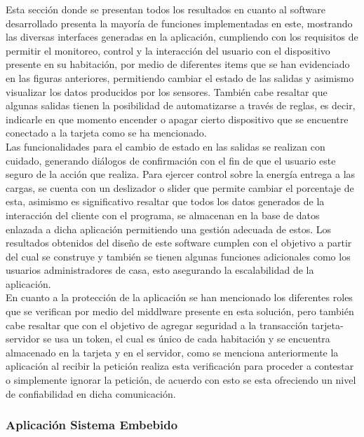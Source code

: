 Esta sección donde se presentan todos los resultados en cuanto al software desarrollado presenta la mayoría de funciones implementadas en este, mostrando las diversas interfaces generadas en la aplicación, cumpliendo con los requisitos de permitir el monitoreo, control y la interacción del usuario con el dispositivo presente en su habitación, por medio de diferentes items que se han evidenciado en las figuras anteriores, permitiendo cambiar el estado de las salidas y asimismo visualizar los datos producidos por los sensores. También cabe resaltar que algunas salidas tienen la posibilidad de automatizarse a través de reglas, es decir, indicarle en que momento encender o apagar cierto dispositivo que se encuentre conectado a la tarjeta como se ha mencionado.\\

Las funcionalidades para el cambio de estado en las salidas se realizan con cuidado, generando diálogos de confirmación con el fin de que el usuario este seguro de la acción que realiza. Para ejercer control sobre la energía entrega a las cargas, se cuenta con un deslizador o slider que permite cambiar el porcentaje de esta, asimismo es significativo resaltar que todos los datos generados de la interacción del cliente con el programa, se almacenan en la base de datos enlazada a dicha aplicación permitiendo una gestión adecuada de estos. Los resultados obtenidos del diseño de este software cumplen con el objetivo a partir del cual se construye y también se tienen algunas funciones adicionales como los usuarios administradores de casa, esto asegurando la escalabilidad de la aplicación. \\

En cuanto a la protección de la aplicación se han mencionado los diferentes roles que se verifican por medio del middlware presente en esta solución, pero también cabe resaltar que con el objetivo de agregar seguridad a la transacción tarjeta-servidor se usa un token, el cual es único de cada habitación y se encuentra almacenado en la tarjeta y en el servidor, como se menciona anteriormente la aplicación al recibir la petición realiza esta verificación para proceder a contestar o simplemente ignorar la petición, de acuerdo con esto se esta ofreciendo un nivel de confiabilidad en dicha comunicación.\\

\subsubsection{Aplicación Sistema Embebido} 

